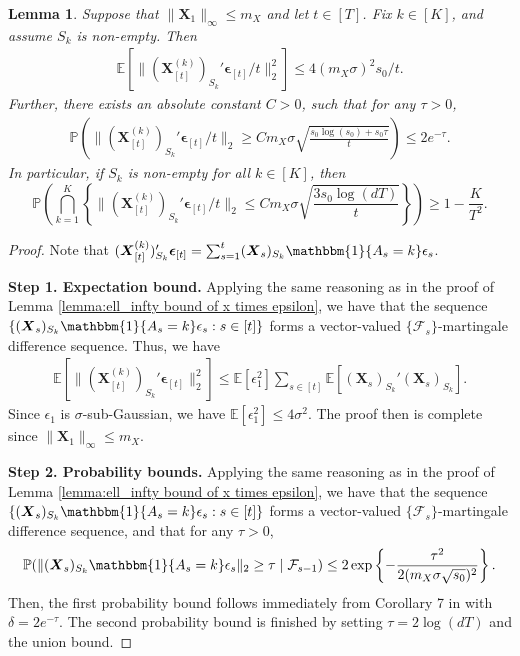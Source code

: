 \documentclass[aos,preprint]{imsart}
\theoremstyle{plain}
\newtheorem{lemma}[theorem]{Lemma}
\theoremstyle{definition}
\newcommand{\bd}[1]{\boldsymbol{#1}}
\newcommand{\idf}{\mathbbm{1}}
\newcommand{\bX}{\boldsymbol{X}}
\newcommand{\bepsilon}{\bd{\epsilon}}
\newcommand{\cF}{\mathcal{F}}
\newcommand{\Exp}{\mathbb{E}}
\newcommand{\Pro}{\mathbb{P}}
\begin{document}
\begin{appendix}
\begin{lemma} \label{lemma: ell_2 bound of x epsilon}
Suppose that $\|\bX_1\|_{\infty}\le m_X$ and let $t \in [T]$. Fix $k \in [K]$, and assume $S_k$ is non-empty. Then 
\begin{align*}
     \Exp\left[ \|(\bX_{[t]}^{(k)})_{S_k}'\bepsilon_{[t]}/t \|_2^2 \right] \le  4(m_X\sigma)^2s_0/t.
\end{align*}
Further, there exists an absolute constant $C>0$, such that for any $\tau>0$,
\begin{align*}
\Pro\left(\|(\bX_{[t]}^{(k)})_{S_k}'\bepsilon_{[t]}/t\|_2 \ge C  m_X\sigma\sqrt{\frac{s_0\log (s_0) + s_0\tau}{t}} \right) \le 2e^{-\tau}.
\end{align*}
In particular, if $S_k$ is non-empty for all $k \in [K]$, then
$$\Pro\left(\bigcap_{k = 1}^{K}\left\{\|(\bX_{[t]}^{(k)})_{S_k}'\bepsilon_{[t]}/t\|_2 \le C  m_X\sigma\sqrt{\frac{3s_0\log (dT)}{t}} \right\} \right)\geq 1- \frac{K}{T^2}.$$
\end{lemma}

\begin{proof}
Note that
$(\bX_{[t]}^{(k)})_{S_k}'\bepsilon_{[t]} = \sum_{s=1}^{t}(\bX_s)_{S_k}\idf\{A_s=k\}\epsilon_s$.

\medskip
\noindent\textbf{Step 1. Expectation bound.} Applying the same reasoning as in the proof of Lemma \ref{lemma:ell_infty bound of x times epsilon}, we have that the sequence $\{(\bX_s)_{S_k}\idf\{A_s=k\}\epsilon_s: s\in [t]\}$ forms a vector-valued $\{\cF_s\}$-martingale difference sequence. Thus, we have
\begin{align*}
   \Exp\left[\|(\bX_{[t]}^{(k)})_{S_k}'\bepsilon_{[t]} \|_2^2\right] \leq   \Exp[\epsilon_1^2] \sum_{s\in [t]}\Exp[(\bX_s)_{S_k}'(\bX_s)_{S_k}].
\end{align*}
Since $\epsilon_1$ is $\sigma$-sub-Gaussian, we have $\Exp[\epsilon_1^2] \leq 4\sigma^2$.
The proof then is complete since $\|\bX_1\|_{\infty} \leq m_X$.


\medskip
\noindent
\textbf{Step 2. Probability bounds.} Applying the same reasoning as in the proof of Lemma \ref{lemma:ell_infty bound of x times epsilon}, we have that the sequence $\{(\bX_s)_{S_k}\idf\{A_s=k\}\epsilon_s: s\in [t]\}$ forms a vector-valued $\{\cF_s\}$-martingale difference sequence, and that
for any $\tau>0$, 
\begin{align*}
    \Pro(\|(\bX_s)_{S_k}\idf\{A_s=k\}\epsilon_s\|_2 \ge \tau \mid \cF_{s-1}) \le 2\exp\left\{-\frac{\tau^2}{2(m_X \sigma \sqrt{s_0})^2} \right\}.
\end{align*}
Then, the first probability bound follows immediately from Corollary 7 in \cite{jin2019short} with $\delta = 2e^{-\tau}$.
The second probability bound is finished by setting $\tau = 2\log (dT)$ and the union bound.
\end{proof}







\end{appendix}
\end{document}

